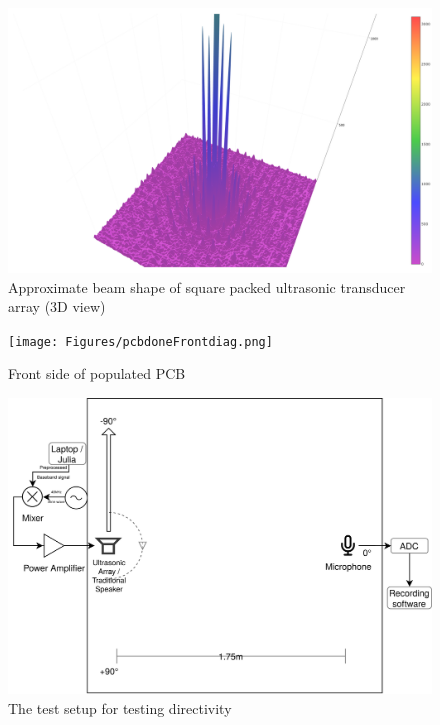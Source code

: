 \documentclass[final,32pt]{beamer}
\begin{document}
\begin{frame}[t]
\begin{multicols}{3}
\begin{figure}[ht!]
    \centering
    \includegraphics[width=\columnwidth]{Figures/Design/arraySim/3dbeamcolzoomier.png}
    \caption{Approximate beam shape of square packed ultrasonic transducer array (3D view)}
    \label{fig:sqr_elem_3Dbeam}
\end{figure}

\begin{figure}[ht!]
    \centering
    \texttt{[image: Figures/pcbdoneFrontdiag.png]}
    \caption{Front side of populated PCB}
    \label{fig:sqr_done}
\end{figure}

\begin{figure}[ht!]
    \centering
    \includegraphics[width=0.7\columnwidth]{Figures/Test/Test_setup.png}
    \caption{The test setup for testing directivity}
    \label{fig:test_setup}
\end{figure}


\end{multicols}
\end{frame}
\end{document}
